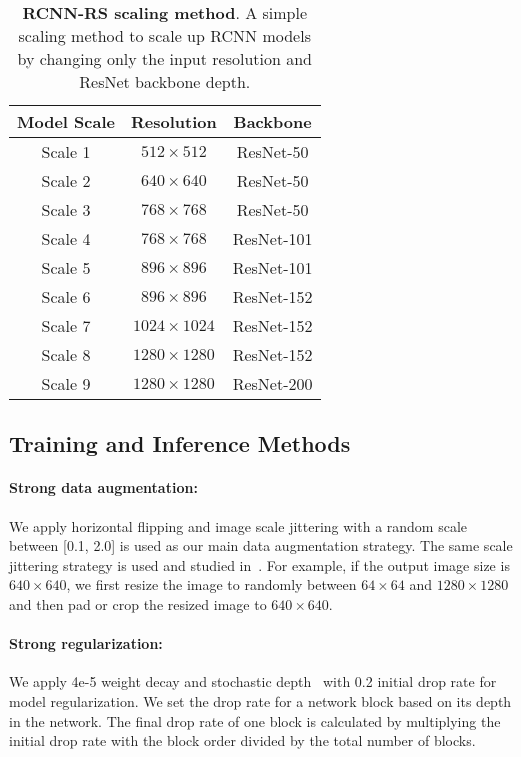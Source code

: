 \documentclass[final]{cvpr}
\begin{document}
\setlength{\tabcolsep}{4pt}
\begin{table}[!ht]
\begin{center}{
\begin{tabular}{c | c c}
\toprule
 Model Scale & Resolution & Backbone\\
\midrule
Scale 1 & $512\times512$ & ResNet-50 \\
Scale 2 & $640\times640$ & ResNet-50 \\
Scale 3 & $768\times768$ & ResNet-50 \\
Scale 4 & $768\times768$ & ResNet-101 \\
Scale 5 & $896\times896$ & ResNet-101 \\
Scale 6 & $896\times896$ & ResNet-152 \\
Scale 7 & $1024\times1024$ & ResNet-152 \\
Scale 8 & $1280\times1280$ & ResNet-152 \\
Scale 9 & $1280\times1280$ & ResNet-200 \\
\bottomrule
\end{tabular}
}
\end{center}
\caption{\textbf{RCNN-RS scaling method}. A simple scaling method to scale up RCNN models by changing only the input resolution and ResNet backbone depth.}
\label{tab:scaling_cas}
\vspace{-0mm}
\end{table}

\subsection{Training and Inference Methods}\label{sec:training_benchmark_settings}

\paragraph{Strong data augmentation:} We apply horizontal flipping and image scale jittering with a random scale between [0.1, 2.0] is used as our main data augmentation strategy. The same scale jittering strategy is used and studied in~\cite{spinenet,efficientdet,copypaste}. For example, if the output image size is $640\times640$, we first resize the image to randomly between $64\times64$ and $1280\times1280$ and then pad or crop the resized image to $640\times640$.

\paragraph{Strong regularization:} We apply 4e-5 weight decay and stochastic depth~\cite{dropconnect} with 0.2 initial drop rate for model regularization. We set the drop rate for a network block based on its depth in the network. The final drop rate of one block is calculated by multiplying the initial drop rate with the block order divided by the total number of blocks.
\end{document}
